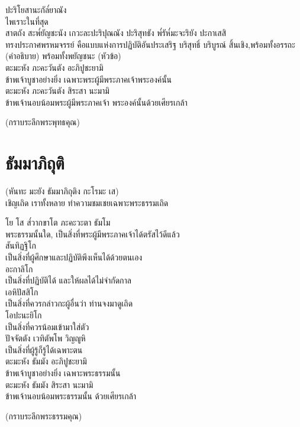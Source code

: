 \documentclass{article}
\begin{document}
ปะริโยสานะกัล๎ยาณัง\\
\indent ไพเราะในที่สุด\\
สาตถัง สะพ๎ยัญชะนัง เกวะละปะริปุณณัง ปะริสุทธัง พ๎รัห๎มะจะริยัง ปะกาเสสิ\\
\indent ทรงประกาศพรหมจรรย์ คือแบบแห่งการปฏิบัติอันประเสริฐ บริสุทธิ์
บริบูรณ์ สิ้นเชิง,พร้อมทั้งอรรถะ (คำอธิบาย) พร้อมทั้งพยัญชนะ (หัวข้อ)\\
ตะมะหัง ภะคะวันตัง อะภิปูชะยามิ\\
\indent ข้าพเจ้าบูชาอย่างยิ่ง เฉพาะพระผู้มีพระภาคเจ้าพระองค์นั้น\\
ตะมะหัง ภะคะวันตัง สิระสา นะมามิ\\
\indent ข้าพเจ้านอบน้อมพระผู้มีพระภาคเจ้า พระองค์นั้นด้วยเศียรเกล้า
\begin{center}
(กราบระลึกพระพุทธคุณ)
\end{center}
\pagebreak
\section{ธัมมาภิถุติ}
\begin{center}
(หันทะ มะยัง ธัมมาภิถุติง กะโรมะ เส)\\
เชิญเถิด เราทั้งหลาย ทำความชมเชยเฉพาะพระธรรมเถิด
\end{center}
โย โส ส๎วากขาโต ภะคะวะตา ธัมโม\\
\indent พระธรรมนั้นใด, เป็นสิ่งที่พระผู้มีพระภาคเจ้าได้ตรัสไว้ดีแล้ว\\
สันทิฏฐิโก\\
\indent เป็นสิ่งที่ผู้ศึกษาและปฏิบัติพึงเห็นได้ด้วยตนเอง\\
อะกาลิโก\\
\indent เป็นสิ่งที่ปฏิบัติได้ และให้ผลได้ไม่จำกัดกาล\\
เอหิปัสสิโก\\
\indent เป็นสิ่งที่ควรกล่าวกะผู้อื่นว่า ท่านจงมาดูเถิด\\
โอปะนะยิโก\\
\indent เป็นสิ่งที่ควรน้อมเข้ามาใส่ตัว\\
ปัจจัตตัง เวทิตัพโพ วิญญูหิ\\
\indent เป็นสิ่งที่ผู้รู้ก็รู้ได้เฉพาะตน\\
ตะมะหัง ธัมมัง อะภิปูชะยามิ\\
\indent ข้าพเจ้าบูชาอย่างยิ่ง เฉพาะพระธรรมนั้น\\
ตะมะหัง ธัมมัง สิระสา นะมามิ\\
\indent ข้าพเจ้านอบน้อมพระธรรมนั้น ด้วยเศียรเกล้า
\begin{center}
(กราบระลึกพระธรรมคุณ)
\end{center}
\pagebreak
\end{document}
